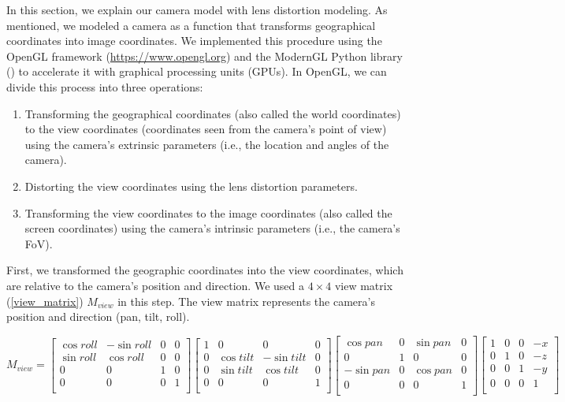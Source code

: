 \documentclass{article}
\providecommand{\tightlist}{%
  \setlength{\itemsep}{0pt}\setlength{\parskip}{0pt}}
\begin{document}
In this section, we explain our camera model with lens distortion modeling. As mentioned, we modeled a camera as a function that transforms geographical coordinates into image coordinates. We implemented this procedure using the OpenGL framework (\url{https://www.opengl.org}) and the ModernGL Python library (\cite{moderngl}) to accelerate it with graphical processing units (GPUs). In OpenGL, we can divide this process into three operations:

\begin{enumerate}
\def\labelenumi{\arabic{enumi}.}
\tightlist
\item
  Transforming the geographical coordinates (also called the world coordinates) to the view coordinates (coordinates seen from the camera's point of view) using the camera's extrinsic parameters (i.e., the location and angles of the camera).
\item
  Distorting the view coordinates using the lens distortion parameters.
\item
  Transforming the view coordinates to the image coordinates (also called the screen coordinates) using the camera's intrinsic parameters (i.e., the camera's FoV).
\end{enumerate}

First, we transformed the geographic coordinates into the view coordinates, which are relative to the camera's position and direction. We used a \(4 \times 4\) view matrix (\ref{view_matrix}) \(M_{view}\) in this step. The view matrix represents the camera's position and direction (pan, tilt, roll).

\begin{equation}
\label{view_matrix}
  M_{view} = 
  \begin{bmatrix}
    \cos roll & -\sin roll & 0 & 0 \\
    \sin roll & \cos roll & 0 & 0 \\
    0 & 0 & 1 & 0 \\
    0 & 0 & 0 & 1 \\
  \end{bmatrix}
  \begin{bmatrix}
    1 & 0 & 0 & 0 \\
    0 & \cos tilt & -\sin tilt & 0 \\
    0 & \sin tilt & \cos tilt & 0 \\
    0 & 0 & 0 & 1 \\
  \end{bmatrix}
  \begin{bmatrix}
    \cos pan & 0 & \sin pan & 0 \\
    0 & 1 & 0 & 0 \\
    -\sin pan & 0 & \cos pan & 0 \\
    0 & 0 & 0 & 1 \\
  \end{bmatrix}
  \begin{bmatrix}
    1 & 0 & 0 & -x \\
    0 & 1 & 0 & -z \\
    0 & 0 & 1 & -y \\
    0& 0 & 0 & 1 \\
  \end{bmatrix}
\end{equation}
\end{document}
